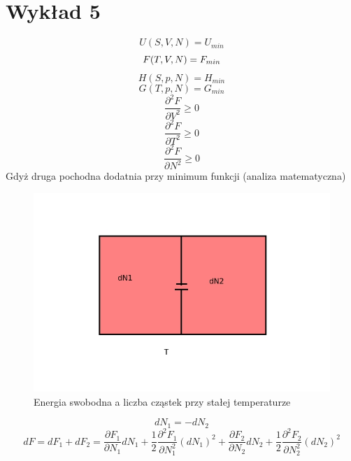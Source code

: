 \documentclass{article}
\begin{document}
	\section{Wykład 5}
		\begin{equation}
		U(S, V, N) = U_{min}
		\end{equation}
		\begin{equation}
		F(T, V, N) = F_{min} \\
		\end{equation}
		\begin{equation}
		H(S, p, N) = H_{min}
		\end{equation}
		\begin{equation}
		G(T, p, N) = G_{min}
		\end{equation}
		\begin{equation}
		\frac{\partial^2F}{\partial V^2} \geqslant 0
		\end{equation}
		\begin{equation}
		\frac{\partial^2F}{\partial T^2} \geqslant 0
		\end{equation}
		\begin{equation}
		\frac{\partial^2F}{\partial N^2} \geqslant 0
		\end{equation}
		Gdyż druga pochodna dodatnia przy minimum funkcji (analiza matematyczna)
		\begin{figure}[ht]
			\label{fig:fig1}
			\centering
			\includegraphics[scale=0.6]{energiaswobodnaczasteczki.jpeg}
			\caption{Energia swobodna a liczba cząstek przy stałej temperaturze}
		\end{figure}
		\begin{equation}
		dN_1 = -dN_2
		\end{equation}
		\begin{equation}
		dF = dF_1 + dF_2 = \frac{\partial F_1}{\partial N_1}dN_1 + 
		\frac{1}{2}\frac{\partial^2 F_1}{\partial N_1^2}(dN_1)^2 +
		\frac{\partial F_2}{\partial N_2}dN_2 + 
		\frac{1}{2}\frac{\partial^2 F_2}{\partial N_2^2}(dN_2)^2
		\end{equation}		
\end{document}
